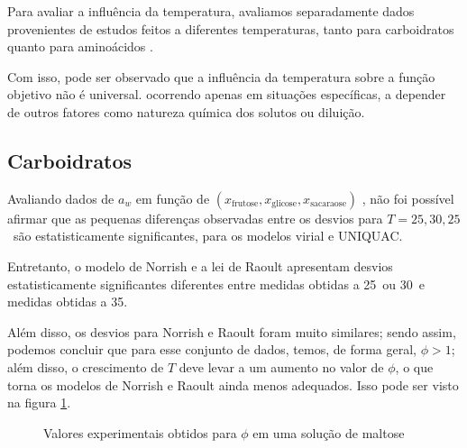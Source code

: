\documentclass[
	12pt,				%
	openright,
	twoside,
	a4paper,			%
	english,			%
	french,				%
	spanish,			%
	brazil				%
	]{abntex2}
\begin{document}
Para avaliar a influência da temperatura, avaliamos separadamente dados
provenientes de estudos feitos a diferentes temperaturas, tanto para carboidratos
\cite{velezmoro2000} quanto para aminoácidos \cite{romero2006,tsurko2007}.

Com isso, pode ser observado que a influência da temperatura sobre a função
objetivo não é universal. ocorrendo apenas em situações específicas, a
depender de outros fatores como natureza química dos solutos ou diluição.

\subsection{Carboidratos}

Avaliando dados de $a_w$ em função de $(x_\text{frutose},x_\text{glicose},%
x_\text{sacaraose})$ \cite{velezmoro2000}, não foi possível afirmar que
as pequenas diferenças observadas entre os desvios para $T=25,30,25$
\textcelsius\ são estatisticamente significantes, para os modelos
virial e UNIQUAC.

Entretanto, o modelo de Norrish e a lei de Raoult apresentam desvios
estatisticamente significantes diferentes entre medidas obtidas a
25\textcelsius\ ou 30\textcelsius\ e medidas obtidas a 35\textcelsius.

Além disso, os desvios para Norrish e Raoult foram muito similares; sendo
assim, podemos concluir que para esse conjunto de dados, temos, de forma
geral, $\phi>1$; além disso, o crescimento de $T$ deve levar a um aumento
no valor de $\phi$, o que torna os modelos de Norrish e Raoult ainda menos
adequados. Isso pode ser visto na figura \ref{fig_temp_carbs}.

\begin{figure}[h]
	\centering
	\caption{Valores experimentais obtidos para $\phi$ em uma solução de maltose}
	\label{fig_temp_carbs}
\end{figure}
\end{document}
